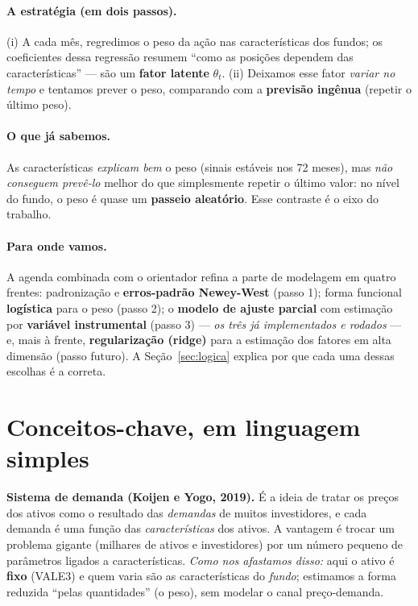 \documentclass[11pt,a4paper]{article}
\begin{document}
\paragraph{A estratégia (em dois passos).} (i) A cada mês, regredimos o peso da ação nas
características dos fundos; os coeficientes dessa regressão resumem ``como as posições dependem
das características'' --- são um \textbf{fator latente} $\theta_t$. (ii) Deixamos esse fator
\emph{variar no tempo} e tentamos prever o peso, comparando com a \textbf{previsão ingênua}
(repetir o último peso).

\paragraph{O que já sabemos.} As características \emph{explicam bem} o peso (sinais estáveis nos
72 meses), mas \emph{não conseguem prevê-lo} melhor do que simplesmente repetir o último valor:
no nível do fundo, o peso é quase um \textbf{passeio aleatório}. Esse contraste é o eixo do
trabalho.

\paragraph{Para onde vamos.} A agenda combinada com o orientador refina a parte de modelagem em
quatro frentes: padronização e \textbf{erros-padrão Newey-West} (passo 1); forma funcional
\textbf{logística} para o peso (passo 2); o \textbf{modelo de ajuste parcial} com estimação por
\textbf{variável instrumental} (passo 3) --- \emph{os três já implementados e rodados} --- e,
mais à frente, \textbf{regularização (ridge)} para a estimação dos fatores em alta dimensão (passo
futuro). A Seção~\ref{sec:logica} explica por que cada uma dessas escolhas é a correta.

\section{Conceitos-chave, em linguagem simples}

\begin{conceito}
\textbf{Sistema de demanda (Koijen e Yogo, 2019).} É a ideia de tratar os preços dos ativos como
o resultado das \emph{demandas} de muitos investidores, e cada demanda é uma função das
\emph{características} dos ativos. A vantagem é trocar um problema gigante (milhares de ativos e
investidores) por um número pequeno de parâmetros ligados a características. \emph{Como nos
afastamos disso:} aqui o ativo é \textbf{fixo} (VALE3) e quem varia são as características do
\emph{fundo}; estimamos a forma reduzida ``pelas quantidades'' (o peso), sem modelar o canal
preço-demanda.
\end{conceito}
\end{document}
